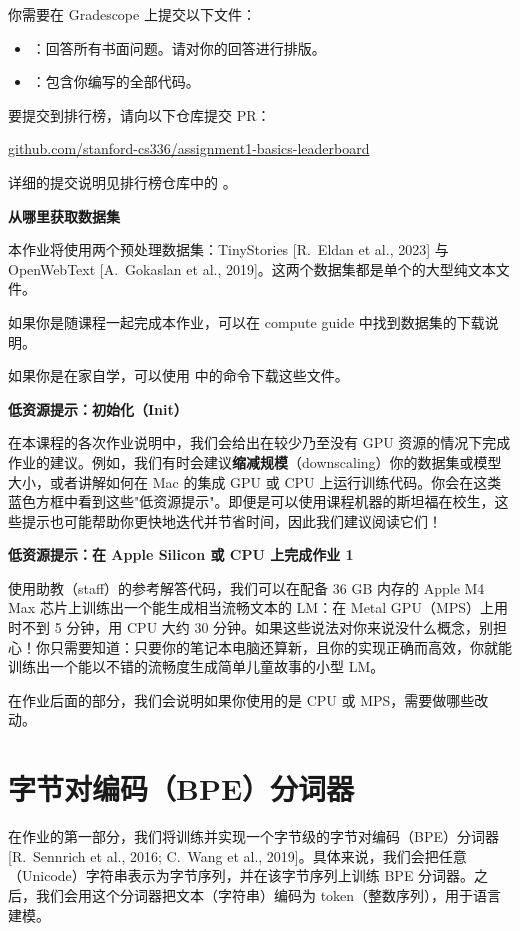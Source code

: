 你需要在 Gradescope 上提交以下文件：
\begin{itemize}
  \item {}：回答所有书面问题。请对你的回答进行排版。
  \item {}：包含你编写的全部代码。
\end{itemize}

要提交到排行榜，请向以下仓库提交 PR：

\begin{center}
\url{github.com/stanford-cs336/assignment1-basics-leaderboard}
\end{center}

详细的提交说明见排行榜仓库中的 。

\textbf{从哪里获取数据集}

本作业将使用两个预处理数据集：TinyStories [R.~Eldan et al., 2023] 与 OpenWebText [A.~Gokaslan et al., 2019]。这两个数据集都是单个的大型纯文本文件。

如果你是随课程一起完成本作业，可以在 compute guide 中找到数据集的下载说明。

如果你是在家自学，可以使用  中的命令下载这些文件。

\textbf{低资源提示：初始化（Init）}

在本课程的各次作业说明中，我们会给出在较少乃至没有 GPU 资源的情况下完成作业的建议。例如，我们有时会建议\textbf{缩减规模}（downscaling）你的数据集或模型大小，或者讲解如何在 Mac 的集成 GPU 或 CPU 上运行训练代码。你会在这类蓝色方框中看到这些"低资源提示"。即便是可以使用课程机器的斯坦福在校生，这些提示也可能帮助你更快地迭代并节省时间，因此我们建议阅读它们！

\textbf{低资源提示：在 Apple Silicon 或 CPU 上完成作业 1}

使用助教（staff）的参考解答代码，我们可以在配备 36 GB 内存的 Apple M4 Max 芯片上训练出一个能生成相当流畅文本的 LM：在 Metal GPU（MPS）上用时不到 5 分钟，用 CPU 大约 30 分钟。如果这些说法对你来说没什么概念，别担心！你只需要知道：只要你的笔记本电脑还算新，且你的实现正确而高效，你就能训练出一个能以不错的流畅度生成简单儿童故事的小型 LM。

在作业后面的部分，我们会说明如果你使用的是 CPU 或 MPS，需要做哪些改动。

\section{字节对编码（BPE）分词器}

在作业的第一部分，我们将训练并实现一个字节级的字节对编码（BPE）分词器 [R.~Sennrich et al., 2016; C.~Wang et al., 2019]。具体来说，我们会把任意（Unicode）字符串表示为字节序列，并在该字节序列上训练 BPE 分词器。之后，我们会用这个分词器把文本（字符串）编码为 token（整数序列），用于语言建模。

